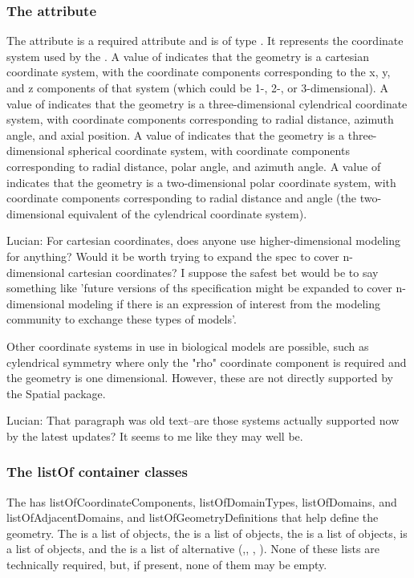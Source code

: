 \subsubsection{The  attribute}
The  attribute is a required attribute and is of type . It represents the coordinate system used by the \Geometry.  A value of   indicates that the geometry is a cartesian coordinate system, with the coordinate components corresponding to the x, y, and z components of that system (which could be 1-, 2-, or 3-dimensional).  A value of  indicates that the geometry is a three-dimensional cylendrical coordinate system, with coordinate components corresponding to radial distance, azimuth angle, and axial position.  A value of  indicates that the geometry is a three-dimensional spherical coordinate system, with coordinate components corresponding to radial distance, polar angle, and azimuth angle.  A value of  indicates that the geometry is a two-dimensional polar coordinate system, with coordinate components corresponding to radial distance and angle (the two-dimensional equivalent of the cylendrical coordinate system).

{\color{red} Lucian: \notice For cartesian coordinates, does anyone use higher-dimensional modeling for anything?  Would it be worth trying to expand the spec to cover n-dimensional cartesian coordinates?  I suppose the safest bet would be to say something like 'future versions of ths specification might be expanded to cover n-dimensional modeling if there is an expression of interest from the modeling community to exchange these types of models'.}

Other coordinate systems in use in biological models are possible, such as cylendrical symmetry where only the "rho" coordinate component is required and the geometry is one dimensional.  However, these are not directly supported by the Spatial package.

{\color{red} Lucian: \notice That paragraph was old text--are those systems actually supported now by the latest updates?  It seems to me like they may well be.}


\subsubsection{The listOf container classes}
The \Geometry has listOfCoordinateComponents, listOfDomainTypes, listOfDomains, and listOfAdjacentDomains, and listOfGeometryDefinitions that help define the geometry.  The \ListOfCoordinateComponents is a list of \CoordinateComponent objects, the \ListOfDomainTypes is a list of \DomainType objects, the \ListOfDomains is a list of \Domain objects, \ListOfAdjacentDomains is a list of \AdjacentDomains objects, and the \ListOfGeometryDefinitions is a list of alternative \GeometryDefinitions (\ParametricGeometry,\CSGeometry, \SampledFieldGeometry, \AnalyticGeometry).  None of these lists are technically required, but, if present, none of them may be empty.

